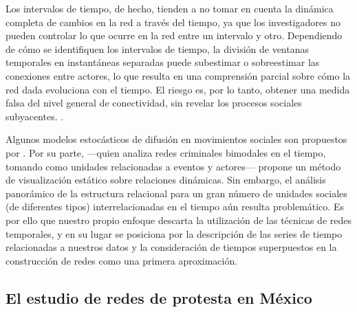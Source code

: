 \documentclass[letterpaper, 11pt]{book}
\theoremstyle{definition}
\theoremstyle{remark}
\begin{document}
\begin{center}
    \begin{minipage}{0.9\linewidth}
        {\setlength{\parindent}{12pt}\small
        Los intervalos de tiempo, de hecho, tienden a no tomar en cuenta la dinámica completa de cambios en la red a través del tiempo, ya que los investigadores no pueden controlar lo que ocurre en la red entre un intervalo y otro. 
	Dependiendo de cómo se identifiquen los intervalos de tiempo, la división de ventanas temporales en instantáneas separadas puede subestimar o sobreestimar las conexiones entre actores, lo que resulta en una comprensión parcial sobre cómo la red dada evoluciona con el tiempo. 
	El riesgo es, por lo tanto, obtener una medida falsa del nivel general de conectividad, sin revelar los procesos sociales subyacentes.
	\normalsize \citep[33]{2017_Broccatelli_BipartiteTemporal}.
        }
    \end{minipage}
\end{center}

Algunos modelos estocásticos de difusión en movimientos sociales son propuestos por \citet{2003_OliverMyers_Difusion}. 
Por su parte, \citet{2017_Broccatelli_BipartiteTemporal} ---quien analiza redes criminales bimodales en el tiempo, tomando como unidades relacionadas a eventos y actores--- propone un método de visualización estático sobre relaciones dinámicas. 
Sin embargo, el análisis panorámico de la estructura relacional para un gran número de unidades sociales (de diferentes tipos) interrelacionadas en el tiempo aún resulta problemático. 
Es por ello que nuestro propio enfoque descarta la utilización  de las técnicas de redes temporales, y en su lugar se 
posiciona por la descripción de las series de tiempo relacionadas a nuestros datos y la consideración de tiempos superpuestos en la construcción de redes como una primera aproximación. 




\subsection{El estudio de redes de protesta en México}
\label{subsubsec:EscenarioMexicano}
\end{document}
